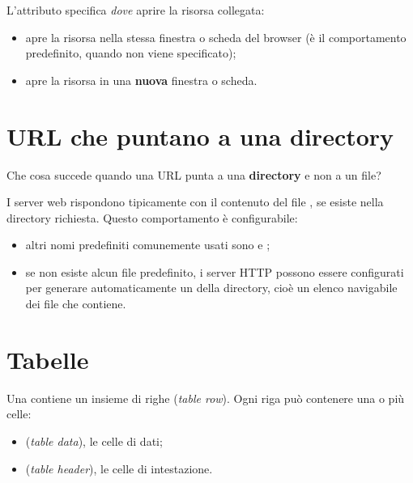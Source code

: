 L'attributo  specifica \textit{dove} aprire la risorsa collegata:

\begin{itemize}
  \item {} apre la risorsa nella stessa
        finestra o scheda del browser (è il comportamento predefinito, quando
         non viene specificato);
  \item {} apre la risorsa in una
        \textbf{nuova} finestra o scheda.
\end{itemize}

\section{URL che puntano a una directory}

Che cosa succede quando una URL punta a una \textbf{directory} e non a un file?

I server web rispondono tipicamente con il contenuto del file ,
se esiste nella directory richiesta. Questo comportamento è configurabile:

\begin{itemize}
  \item altri nomi predefiniti comunemente usati sono  e
        ;
  \item se non esiste alcun file predefinito, i server HTTP possono essere
        configurati per generare automaticamente un  della
        directory, cioè un elenco navigabile dei file che contiene.
\end{itemize}


\section{Tabelle}

Una   contiene un insieme di righe 
(\textit{table row}). Ogni riga può contenere una o più celle:

\begin{itemize}
  \item {} (\textit{table data}), le celle di dati;
  \item {} (\textit{table header}), le celle di intestazione.
\end{itemize}

